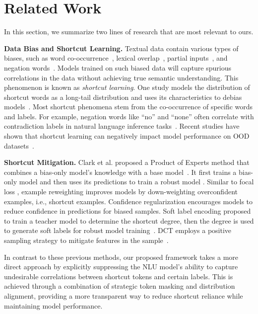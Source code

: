 \section{Related Work}
\vspace{3ex}
In this section, we summarize two lines of research that are most relevant to ours.

\noindent\textbf{Data Bias and Shortcut Learning.}\quad
Textual data contain various types of biases, such as word co-occurrence~\cite{gururangan2018annotation}, lexical overlap~\cite{mccoy2019right}, partial inputs~\cite{gururangan2018annotation,poliak2018hypothesis}, and negation words~\cite{utama2020towards}.
Models trained on such biased data will capture spurious correlations in the data without achieving true semantic understanding. This phenomenon is known as \emph{shortcut learning}.
One study models the distribution of shortcut words as a long-tail distribution and uses its characteristics to debias models~\cite{du2021towards}.
Most shortcut phenomena stem from the co-occurrence of specific words and labels. For example, negation words like ``no'' and ``none'' often correlate with contradiction labels in natural language inference tasks~\cite{gururangan2018annotation}.
Recent studies have shown that shortcut learning can negatively impact model performance on OOD datasets~\cite{geirhos2020shortcut,gururangan2018annotation}.

\vspace{2pt}
\noindent \textbf{Shortcut Mitigation.}\quad 
Clark et al. proposed a Product of Experts method that combines a bias-only model's knowledge with a base model~\cite{clark2019don}. It first trains a bias-only model and then uses its predictions to train a robust model \cite{schuster2019towards}.
Similar to focal loss \cite{lin2017focal}, example reweighting \cite{clark2019don} improves models by down-weighting overconfident examples, i.e., shortcut examples.
Confidence regularization \cite{utama2020mind} encourages models to reduce confidence in predictions for biased samples.
Soft label encoding proposed to train a teacher model to determine the shortcut degree, then the degree is used to generate soft labels for robust model training~\cite{he2023mitigating}. DCT employs a positive sampling
strategy to mitigate features in the sample~\cite{lyu2023feature}.

In contrast to these previous methods, our proposed framework takes a more direct approach by explicitly suppressing the NLU model's ability to capture undesirable correlations between shortcut tokens and certain labels. This is achieved through a combination of strategic token masking and distribution alignment, providing a more transparent way to reduce shortcut reliance while maintaining model performance.